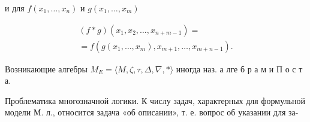 \documentclass[10pt]{article}
\begin{document}
и для $f\left(x_{1}, \ldots, x_{n}\right)$ и $g\left(x_{1}, \ldots, x_{m}\right)$



\[

\begin{gathered}

(f * g)\left(x_{1}, x_{2}, \ldots, x_{n+m-1}\right)= \\

=f\left(g\left(x_{1}, \ldots, x_{m}\right), x_{m+1}, \ldots, x_{m+n-1}\right) .

\end{gathered}

\]



Возникающие алгебры $M_{E}=\langle M, \zeta, \tau, \Delta, \nabla, *\rangle$ иногда наз. а лге б р а м и П о с т а.



Проблематика многозначной логики. К числу задач, характерных для формульной модели М. л., относится задача «об описании», т. е. вопрос об указании для за-
\end{document}
